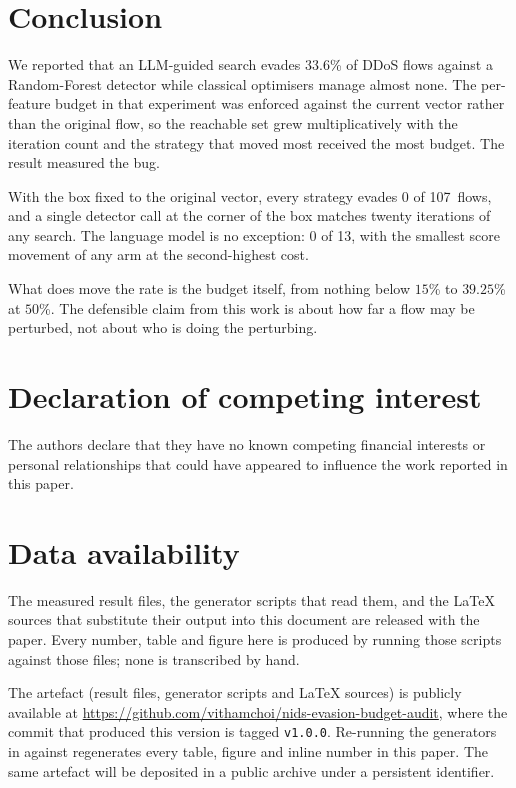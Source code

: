 \documentclass[journal]{IEEEtran}
\theoremstyle{definition}
\newcommand{\LLMesr}{33.6}
\newcommand{\CN}{107}
\newcommand{\CGreedyEv}{0}
\newcommand{\CLlmN}{13}
\newcommand{\CLlmEv}{0}
\newcommand{\CEsrF}{39.25}
\newcommand{\CEpsFirst}{15}
\newcommand{\CEpsTen}{50}
\begin{document}
\section{Conclusion}
\label{sec:conclusion}

We reported that an LLM-guided search evades $\LLMesr$\% of DDoS flows against a
Random-Forest detector while classical optimisers manage almost none. The
per-feature budget in that experiment was enforced against the current vector
rather than the original flow, so the reachable set grew multiplicatively with
the iteration count and the strategy that moved most received the most budget.
The result measured the bug.

With the box fixed to the original vector, every strategy evades $\CGreedyEv$ of
\CN\ flows, and a single detector call at the corner of the box matches twenty
iterations of any search. The language model is no exception: $\CLlmEv$ of
\CLlmN, with the smallest score movement of any arm at the second-highest cost.

What does move the rate is the budget itself, from nothing below $\CEpsFirst$\%
to $\CEsrF$\% at $\CEpsTen$\%. The defensible claim from this work is about how
far a flow may be perturbed, not about who is doing the perturbing.


\section*{Declaration of competing interest}

The authors declare that they have no known competing financial interests or
personal relationships that could have appeared to influence the work reported
in this paper.


\section*{Data availability}

The measured result files, the generator scripts that read them, and the LaTeX
sources that substitute their output into this document are released with the
paper. Every number, table and figure here is produced by running those scripts
against those files; none is transcribed by hand.

The artefact (result files, generator scripts and \LaTeX{} sources) is publicly
available at \url{https://github.com/vithamchoi/nids-evasion-budget-audit}, where the commit that
produced this version is tagged \texttt{v1.0.0}. Re-running the generators in
 against  regenerates every table, figure and
inline number in this paper. The same artefact will be deposited in a public
archive under a persistent identifier.




\end{document}
